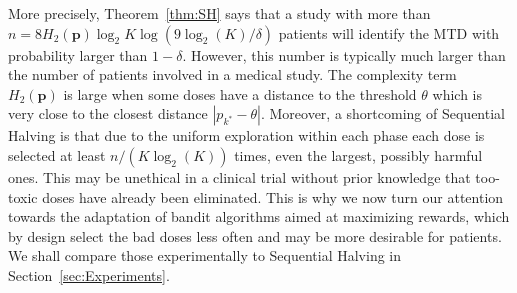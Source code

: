 More precisely, Theorem~\ref{thm:SH} says that a study with more than $n = 8 H_2(\bm p) \log_2 K\log\left(9\log_2(K)/\delta\right)$ patients will identify the MTD with probability larger than $1-\delta$. However, this number is typically much larger than the number of patients involved in a medical study. The complexity term $H_2(\bm p)$ is large when some doses have a distance to the threshold $\theta$ which is very close to the closest distance $|p_{k^*} - \theta|$. Moreover, a shortcoming of Sequential Halving is that due to the uniform exploration within each phase each dose is selected at least $n / (K\log_2(K))$ times, even the largest, possibly harmful ones. This may be unethical in a  clinical trial without prior knowledge that too-toxic doses have already been eliminated. This is why we now turn our attention towards the adaptation of bandit algorithms aimed at maximizing rewards, which by design select the bad doses less often and may be more desirable for patients. We shall compare those experimentally to Sequential Halving in Section~\ref{sec:Experiments}.



                  


